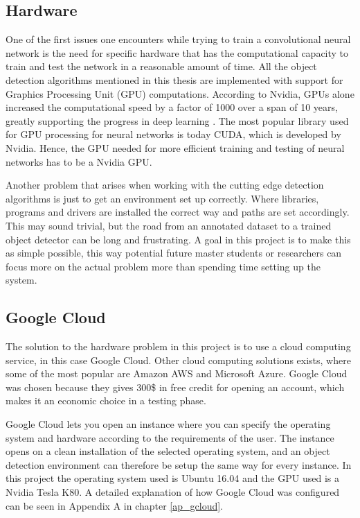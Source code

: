 \subsection{Hardware}
One of the first issues one encounters while trying to train a convolutional neural network is the need for specific hardware that has the computational capacity to train and test the network in a reasonable amount of time. All the object detection algorithms mentioned in this thesis are implemented with support for Graphics Processing Unit (GPU) computations. According to Nvidia, GPUs alone increased the computational speed by a factor of 1000 over a span of 10 years, greatly supporting the progress in deep learning \citep{Dettmers2015}. The most popular library used for GPU processing for neural networks is today CUDA, which is developed by Nvidia. Hence, the GPU needed for more efficient training and testing of neural networks has to be a Nvidia GPU. 

\vspace{3mm}

Another problem that arises when working with the cutting edge detection algorithms is just to get an environment set up correctly. Where libraries, programs and drivers are installed the correct way and paths are set accordingly. This may sound trivial, but the road from an annotated dataset to a trained object detector can be long and frustrating. A goal in this project is to make this as simple possible, this way potential future master students or researchers can focus more on the actual problem more than spending time setting up the system. 

\subsection{Google Cloud}
The solution to the hardware problem in this project is to use a cloud computing service, in this case Google Cloud. Other cloud computing solutions exists, where some of the most popular are Amazon AWS and Microsoft Azure. Google Cloud was chosen because they gives 300\$ in free credit for opening an account, which makes it an economic choice in a testing phase.

\vspace{3mm}

Google Cloud lets you open an instance where you can specify the operating system and hardware according to the requirements of the user. The instance opens on a clean installation of the selected operating system, and an object detection environment can therefore be setup the same way for every instance. In this project the operating system used is Ubuntu 16.04 and the GPU used is a Nvidia Tesla K80. A detailed explanation of how Google Cloud was configured can be seen in Appendix A in chapter \ref{ap_gcloud}.


